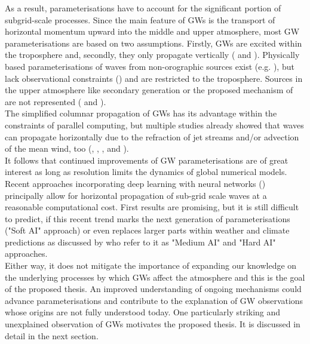 As a result, parameterisations have to account for the significant portion of subgrid-scale processes. Since the main feature of GWs is the transport of horizontal momentum upward into the middle and upper atmosphere, most GW parameterisations are based on two assumptions. Firstly, GWs are excited within the troposphere and, secondly, they only propagate vertically (\cite{plougonven_how_2020} and \cite{alexander_recent_2010}). Physically based parameterisations of waves from non-orographic sources exist (e.g. \cite{scinocca_accurate_2003}), but lack observational constraints (\cite{plougonven_internal_2014}) and are restricted to the troposphere. Sources in the upper atmosphere like secondary generation or the proposed mechanism of \textcite{dornbrack_stratospheric_2022} are not represented (\cite{plougonven_how_2020} and \cite{kim_overview_2003}). \\
The simplified columnar propagation of GWs has its advantage within the constraints of parallel computing, but multiple studies already showed that waves can propagate horizontally due to the refraction of jet streams and/or advection of the mean wind, too (\cite{dunkerton_inertiagravity_1984}, \cite{preusse_space-based_2002}, \cite{sato_origins_2009}, \cite{sato_gravity_2012} and \cite{ehard_horizontal_2017}). \\ %
It follows that continued improvements of GW parameterisations are of great interest as long as resolution limits the dynamics of global numerical models. Recent approaches incorporating deep learning with neural networks (\cite{matsuoka_application_2020}) principally allow for horizontal propagation of sub-grid scale waves at a reasonable computational cost. First results are promising, but it is still difficult to predict, if this recent trend marks the next generation of parameterisations ("Soft AI" approach) or even replaces larger parts within weather and climate predictions as discussed by \textcite{chantry_opportunities_2021} who refer to it as "Medium AI" and "Hard AI" approaches. \\
Either way, it does not mitigate the importance of expanding our knowledge on the underlying processes by which GWs affect the atmosphere and this is the goal of the proposed thesis. An improved understanding of ongoing mechanisms could advance parameterisations and contribute to the explanation of GW observations whose origins are not fully understood today. One particularly striking and unexplained observation of GWs motivates the proposed thesis. It is discussed in detail in the next section.

